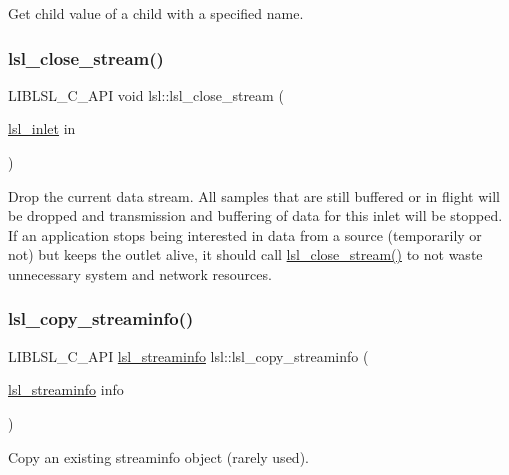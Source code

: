 Get child value of a child with a specified name. \mbox{\label{namespacelsl_a3adefb15364dacbfa8f46b5f554ed4ac}} 
\subsubsection{\texorpdfstring{lsl\+\_\+close\+\_\+stream()}{lsl\_close\_stream()}}
{\footnotesize\ttfamily L\+I\+B\+L\+S\+L\+\_\+\+C\+\_\+\+A\+PI void lsl\+::lsl\+\_\+close\+\_\+stream (\begin{DoxyParamCaption}\item[{\hyperlink{namespacelsl_a884a3363cfcba75d7ce8f00c1c4c54f1}{lsl\+\_\+inlet}}]{in }\end{DoxyParamCaption})}

Drop the current data stream. All samples that are still buffered or in flight will be dropped and transmission and buffering of data for this inlet will be stopped. If an application stops being interested in data from a source (temporarily or not) but keeps the outlet alive, it should call \hyperlink{namespacelsl_a3adefb15364dacbfa8f46b5f554ed4ac}{lsl\+\_\+close\+\_\+stream()} to not waste unnecessary system and network resources. \mbox{\label{namespacelsl_a354a91fa3a4c87cdf179443650425390}} 
\subsubsection{\texorpdfstring{lsl\+\_\+copy\+\_\+streaminfo()}{lsl\_copy\_streaminfo()}}
{\footnotesize\ttfamily L\+I\+B\+L\+S\+L\+\_\+\+C\+\_\+\+A\+PI \hyperlink{namespacelsl_aa0a9ce9956061679949daa2e35aae2e8}{lsl\+\_\+streaminfo} lsl\+::lsl\+\_\+copy\+\_\+streaminfo (\begin{DoxyParamCaption}\item[{\hyperlink{namespacelsl_aa0a9ce9956061679949daa2e35aae2e8}{lsl\+\_\+streaminfo}}]{info }\end{DoxyParamCaption})}

Copy an existing streaminfo object (rarely used). \mbox{\label{namespacelsl_a8da66ce60f1720e808771e14337e4bdb}} 
